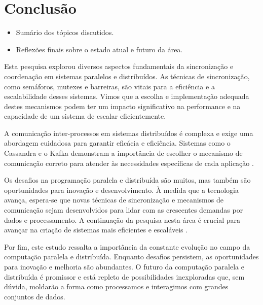\documentclass[conference]{IEEEtran}
\begin{document}
\section{Conclusão}
\begin{itemize}
    \item Sumário dos tópicos discutidos.
    \item Reflexões finais sobre o estado atual e futuro da área.
\end{itemize}

Esta pesquisa explorou diversos aspectos fundamentais da sincronização e coordenação 
em sistemas paralelos e distribuídos. 
As técnicas de sincronização, como semáforos, mutexes e barreiras, 
são vitais para a eficiência e a escalabilidade desses sistemas. 
Vimos que a escolha e implementação adequada destes mecanismos 
podem ter um impacto significativo na performance e na capacidade 
de um sistema de escalar eficientemente.

A comunicação inter-processos em sistemas distribuídos é complexa e 
exige uma abordagem cuidadosa para garantir eficácia e eficiência. 
Sistemas como o Cassandra e o Kafka demonstram a importância de escolher 
o mecanismo de comunicação correto para atender às necessidades específicas 
de cada aplicação \cite{lakshman2010cassandra, kreps2011kafka}.

Os desafios na programação paralela e distribuída são muitos, 
mas também são oportunidades para inovação e desenvolvimento. 
À medida que a tecnologia avança, espera-se que novas técnicas de sincronização 
e mecanismos de comunicação sejam desenvolvidos para lidar com 
as crescentes demandas por dados e processamento. 
A continuação da pesquisa nesta área é crucial para avançar na criação 
de sistemas mais eficientes e escaláveis \cite{hennessy2011computer}.

Por fim, este estudo ressalta a importância da constante evolução 
no campo da computação paralela e distribuída. 
Enquanto desafios persistem, as oportunidades para inovação e 
melhoria são abundantes. 
O futuro da computação paralela e distribuída é promissor e 
está repleto de possibilidades inexploradas que, sem dúvida, 
moldarão a forma como processamos e interagimos com grandes conjuntos de dados.


\end{document}
